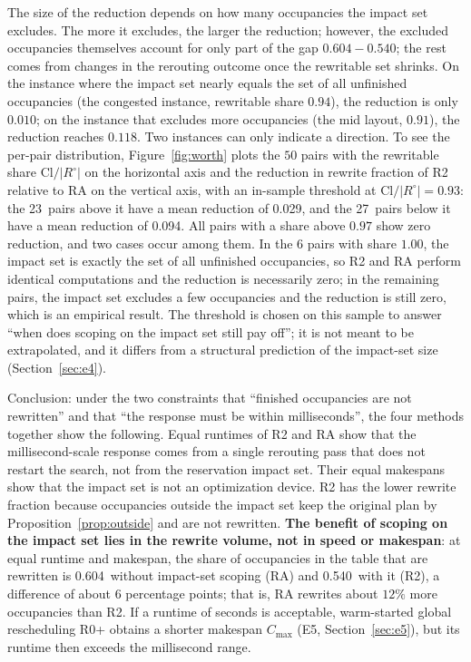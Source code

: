 \documentclass[manuscript,screen,review]{acmart}
\newcommand{\NPairs}{50}
\newcommand{\ResFracCheapRtwo}{0.540}
\newcommand{\ResFracAllFuture}{0.604}
\newcommand{\ScaleCloAliveHi}{0.91}  %
\newcommand{\WorthThresh}{0.93}
\newcommand{\WorthLowN}{27}
\newcommand{\WorthLowMean}{0.094}
\newcommand{\WorthHighN}{23}
\newcommand{\WorthHighMean}{0.029}
\newcommand{\WorthVanish}{0.97}
\begin{document}
The size of the reduction depends on how many occupancies the impact set excludes. The more it excludes, the larger the reduction; however, the excluded occupancies themselves account for only part of
the gap \(\ResFracAllFuture-\ResFracCheapRtwo\); the rest comes from changes in the rerouting outcome once the rewritable set shrinks.
On the instance where the impact set nearly equals the set of all unfinished occupancies (the congested instance, rewritable share \(0.94\)),
the reduction is only \(0.010\); on the instance that excludes more occupancies (the mid layout, \(0.91\)), the reduction reaches \(0.118\).
Two instances can only indicate a direction. To see the per-pair distribution, Figure~\ref{fig:worth} plots the \(\NPairs\) pairs with the rewritable share
\(\mathrm{Cl}/|R^{\circ}|\) on the horizontal axis and the reduction in rewrite fraction of R2 relative to RA on the vertical axis,
with an in-sample threshold at \(\mathrm{Cl}/|R^{\circ}|=\WorthThresh\): the \WorthHighN\ pairs above it have a mean reduction of
\WorthHighMean, and the \WorthLowN\ pairs below it have a mean reduction of \WorthLowMean.
All pairs with a share above \(\WorthVanish\) show zero reduction, and two cases occur among them. In the \(6\) pairs with share \(1.00\),
the impact set is exactly the set of all unfinished occupancies, so R2 and RA perform identical computations and the reduction is necessarily zero;
in the remaining pairs, the impact set excludes a few occupancies and the reduction is still zero, which is an empirical result.
The threshold is chosen on this sample to answer ``when does scoping on the impact set still pay off''; it is not meant to be extrapolated,
and it differs from a structural prediction of the impact-set size (Section~\ref{sec:e4}).

Conclusion: under the two constraints that ``finished occupancies are not rewritten'' and that ``the response must be within milliseconds'', the four methods together show the following.
Equal runtimes of R2 and RA show that the millisecond-scale response comes from a single rerouting pass that does not restart the search, not from the reservation impact set.
Their equal makespans show that the impact set is not an optimization device.
R2 has the lower rewrite fraction because occupancies outside the impact set keep the original plan by Proposition~\ref{prop:outside} and are not rewritten.
\textbf{The benefit of scoping on the impact set lies in the rewrite volume, not in speed or makespan}:
at equal runtime and makespan, the share of occupancies in the table that are rewritten is \ResFracAllFuture\ without impact-set scoping (RA)
and \ResFracCheapRtwo\ with it (R2), a difference of about \(6\) percentage points; that is, RA rewrites about \(12\%\) more occupancies than R2.
If a runtime of seconds is acceptable, warm-started global rescheduling R0+ obtains a shorter makespan \(C_{\max}\) (E5, Section~\ref{sec:e5}),
but its runtime then exceeds the millisecond range.
\end{document}
